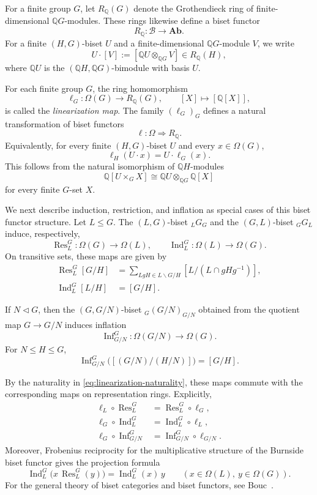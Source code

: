 \documentclass[a4paper,11pt]{article}
\numberwithin{equation}{section}
\newcommand{\Q}{\mathbb{Q}}
\newcommand{\Ind}{\operatorname{Ind}}
\newcommand{\Inf}{\operatorname{Inf}}
\newcommand{\Res}{\operatorname{Res}}
\begin{document}
For a finite group $G$, let $R_{\Q}(G)$ denote the Grothendieck ring of
finite-dimensional $\Q G$-modules. These rings likewise define a biset functor
\[
  R_{\Q}:\mathcal B\longrightarrow\mathbf{Ab}.
\]
For a finite $(H,G)$-biset $U$ and a finite-dimensional $\Q G$-module $V$, we write
\[
  U\cdot[V]
  :=[\Q U\otimes_{\Q G}V]
  \in R_{\Q}(H),
\]
where $\Q U$ is the $(\Q H,\Q G)$-bimodule with basis $U$.

For each finite group $G$, the ring homomorphism
\begin{equation}\label{eq:linearization-general}
  \ell_G:\Omega(G)\longrightarrow R_{\Q}(G),
  \qquad [X]\longmapsto[\Q[X]],
\end{equation}
is called the \emph{linearization map}. The family $(\ell_G)_G$ defines a natural
transformation of biset functors
\[
  \ell:\Omega\Longrightarrow R_{\Q}.
\]
Equivalently, for every finite $(H,G)$-biset $U$ and every $x\in\Omega(G)$,
\begin{equation}\label{eq:linearization-naturality}
  \ell_H(U\cdot x)=U\cdot\ell_G(x).
\end{equation}
This follows from the natural isomorphism of $\Q H$-modules
\[
  \Q[U\times_G X]
  \cong
  \Q U\otimes_{\Q G}\Q[X]
\]
for every finite $G$-set $X$.

We next describe induction, restriction, and inflation as special cases of this biset
functor structure. Let $L\le G$. The $(L,G)$-biset ${}_LG_G$ and the $(G,L)$-biset
${}_GG_L$ induce, respectively,
\[
  \Res_L^G:\Omega(G)\longrightarrow\Omega(L),
  \qquad
  \Ind_L^G:\Omega(L)\longrightarrow\Omega(G).
\]
On transitive sets, these maps are given by
\begin{align}
  \Res_L^G[G/H]
  &=\sum_{LgH\in L\backslash G/H}
  [L/(L\cap gHg^{-1})],
  \label{eq:restriction}\\
  \Ind_L^G[L/H]
  &=[G/H].
  \label{eq:induction}
\end{align}

If $N\triangleleft G$, then the $(G,G/N)$-biset ${}_G(G/N)_{G/N}$ obtained from the
quotient map $G\to G/N$ induces inflation
\[
  \Inf_{G/N}^{G}:\Omega(G/N)\longrightarrow\Omega(G).
\]
For $N\le H\le G$,
\[
  \Inf_{G/N}^{G}\bigl([(G/N)/(H/N)]\bigr)=[G/H].
\]

By the naturality in \eqref{eq:linearization-naturality}, these maps commute with the
corresponding maps on representation rings. Explicitly,
\[
\begin{aligned}
  \ell_L\circ\Res_L^G
  &=\Res_L^G\circ\ell_G,\\
  \ell_G\circ\Ind_L^G
  &=\Ind_L^G\circ\ell_L,\\
  \ell_G\circ\Inf_{G/N}^G
  &=\Inf_{G/N}^G\circ\ell_{G/N}.
\end{aligned}
\]
Moreover, Frobenius reciprocity for the multiplicative structure of the Burnside
biset functor gives the projection formula
\begin{equation}\label{eq:projection-formula}
  \Ind_L^G\bigl(x\,\Res_L^G(y)\bigr)
  =\Ind_L^G(x)\,y
  \qquad
  (x\in\Omega(L),\ y\in\Omega(G)).
\end{equation}
For the general theory of biset categories and biset functors, see
Bouc~\cite{BoucBiset}.
\end{document}
